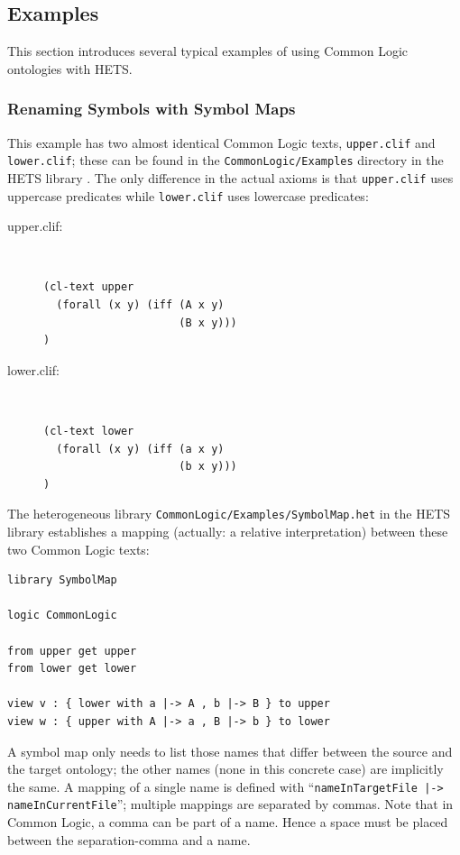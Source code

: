 \documentclass{article}
\newcommand{\normalTEXTSC}[2]{{#1\scriptsize#2}}
\newcommand     {\Hets}{\normalTEXTSC{H}{ETS}\xspace}
\begin{document}
\subsection{Examples}
\label{sec:examples}

This section introduces several typical examples of using Common Logic ontologies with \Hets.

\subsubsection{Renaming Symbols with Symbol Maps}
\label{sec:renam-symb-with}

This example has two almost identical Common Logic texts, \texttt{upper.clif} and 
\texttt{lower.clif}; these can be found in the \texttt{CommonLogic/Examples} directory in the \Hets library \cite{hets-library:URL}. The only difference in the actual axioms is that 
\texttt{upper.clif} uses uppercase predicates while \texttt{lower.clif} 
uses lowercase predicates:
\begin{description}
\item[upper.clif:]~\\
\begin{lstlisting}[language=clif]
(cl-text upper
  (forall (x y) (iff (A x y)
                     (B x y)))
)
\end{lstlisting}
\item[lower.clif:]~\\
\begin{lstlisting}[language=clif]
(cl-text lower
  (forall (x y) (iff (a x y)
                     (b x y)))
)
\end{lstlisting}
\end{description}

The heterogeneous library \texttt{CommonLogic/Examples/SymbolMap.het} in the \Hets library \cite{hets-library:URL} establishes a mapping (actually: a relative interpretation) between these two Common Logic texts:

\begin{lstlisting}[language=hetcasl]
library SymbolMap

logic CommonLogic

from upper get upper
from lower get lower

view v : { lower with a |-> A , b |-> B } to upper
view w : { upper with A |-> a , B |-> b } to lower 
\end{lstlisting}

A symbol map only needs to list those names that differ between the source
and the target ontology; the other names (none in this concrete case) are implicitly the same.  A mapping of a single name is defined with 
``\texttt{nameInTargetFile |-> nameInCurrentFile}''; multiple mappings are 
separated by commas. Note that in Common Logic, a comma can be part of a name.
Hence a space must be placed between the separation-comma and a name.
\end{document}
